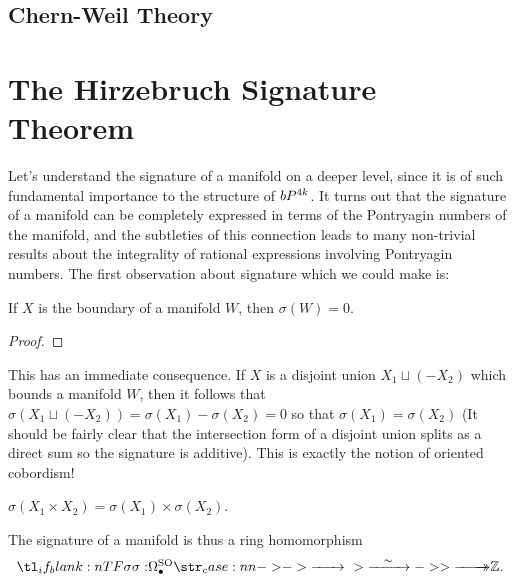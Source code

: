 \subsection{Chern-Weil Theory}

\section{The Hirzebruch Signature Theorem}

Let's understand the signature of a manifold on a deeper level, since it is of such fundamental importance to the structure of $bP^{4k}$.  It turns out that the signature of a manifold can be completely expressed in terms of the Pontryagin numbers of the manifold, and the subtleties of this connection leads to many non-trivial results about the integrality of rational expressions involving Pontryagin numbers. The first observation about signature which we could make is:

\begin{proposition}
	If $X$ is the boundary of a manifold $W$, then $\sigma(W)=0$.
\end{proposition}
\begin{proof}
\end{proof}

This has an immediate consequence. If $X$ is a disjoint union $X_1\sqcup (-X_2)$ which bounds a manifold $W$, then it follows that $\sigma(X_1\sqcup (-X_2))=\sigma(X_1)-\sigma(X_2)=0$ so that $\sigma(X_1)=\sigma(X_2)$ (It should be fairly clear that the intersection form of a disjoint union splits as a direct sum so the signature is additive). 
This is exactly the notion of oriented cobordism!

\begin{proposition}
	$\sigma(X_1\times X_2) = \sigma(X_1)\times \sigma(X_2)$.
\end{proposition}

\begin{corollary}
	The signature of a manifold is thus a ring homomorphism
	\[
		\lkxfunc{\sigma}{\Omega^\SO_{\bullet}}{\Z.}
	\]
\end{corollary}

